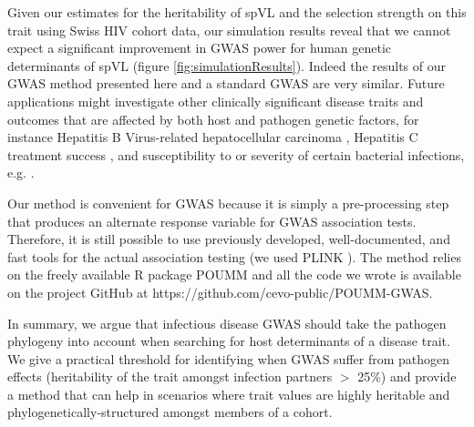 \documentclass[]{article}
\begin{document}
\begin{doublespace}
Given our estimates for the heritability of spVL and the selection strength on this trait using Swiss HIV cohort data, our simulation results reveal that we cannot expect a significant improvement in GWAS power for human genetic determinants of spVL (figure \ref{fig:simulationResults}). Indeed the results of our  GWAS method presented here and a standard GWAS are very similar. Future applications might investigate other clinically significant disease traits and outcomes that are affected by both host and pathogen genetic factors, for instance Hepatitis B Virus-related hepatocellular carcinoma \citep{An2018HostCarcinoma}, Hepatitis C treatment success \citep{Ansari2017Genome-to-genomeVirus}, and susceptibility to or severity of certain bacterial infections, e.g. \cite{Messina2016ImpactInfections, Donnenberg2015BacterialStudies}.

Our method is convenient for GWAS because it is simply a pre-processing step that produces an alternate response variable for GWAS association tests. Therefore, it is still possible to use previously developed, well-documented, and fast tools for the actual association testing (we used PLINK \citep{Chang2015}). The method relies on the freely available R package POUMM \citep{Mitov2017a-POUMM} and all the code we wrote is available on the project GitHub at https://github.com/cevo-public/POUMM-GWAS.

In summary, we argue that infectious disease GWAS should take the pathogen phylogeny into account when searching for host determinants of a disease trait. We give a practical threshold for identifying when GWAS suffer from pathogen effects (heritability of the trait amongst infection partners $>$ 25\%) and provide a method that can help in scenarios where trait values are highly heritable and phylogenetically-structured amongst members of a cohort.


\end{doublespace}
\end{document}

